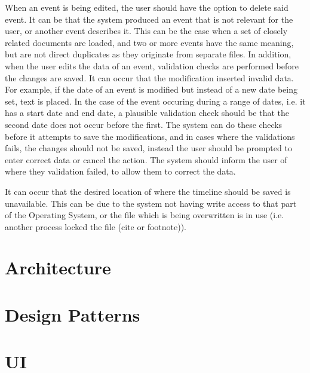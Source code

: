 \par When an event is being edited, the user should have the option to delete said event. It can be that the system produced an event that is not relevant for the user, or another event describes it. This can be the case when a set of closely related documents are loaded, and two or more events have the same meaning, but are not direct duplicates as they originate from separate files. In addition, when the user edits the data of an event, validation checks are performed before the changes are saved. It can occur that the modification inserted invalid data. For example, if the date of an event is modified but instead of a new date being set, text is placed. In the case of the event occuring during a range of dates, i.e. it has a start date and end date, a plausible validation check should be that the second date does not occur before the first. The system can do these checks before it attempts to save the modifications, and in cases where the validations fails, the changes should not be saved, instead the user should be prompted to enter correct data or cancel the action. The system should inform the user of where they validation failed, to allow them to correct the data.
\par It can occur that the desired location of where the timeline should be saved is unavailable. This can be due to the system not having write access to that part of the Operating System, or the file which is being overwritten is in use (i.e. another process locked the file (cite or footnote)).
\section{Architecture}
\section{Design Patterns}
\section{UI}










